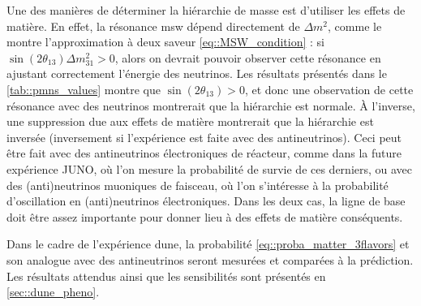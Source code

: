             Une des manières de déterminer la hiérarchie de masse est d'utiliser les effets de matière. En effet, la résonance \gls{msw} dépend directement de $\Delta m^2$, comme le montre l'approximation à deux saveur \eqref{eq::MSW_condition} : si $\sin(2\theta_{13})\Delta m^2_{31} > 0$, alors on devrait pouvoir observer cette résonance en ajustant correctement l'énergie des neutrinos. Les résultats présentés dans le \autoref{tab::pmns_values} montre que $\sin(2\theta_{13}) > 0$, et donc une observation de cette résonance avec des neutrinos montrerait que la hiérarchie est normale. À l'inverse, une suppression due aux effets de matière montrerait que la hiérarchie est inversée (inversement si l'expérience est faite avec des antineutrinos). Ceci peut être fait avec des antineutrinos électroniques de réacteur, comme dans la future expérience JUNO\cite{Yang2015}, où l'on mesure la probabilité de survie de ces derniers, ou avec des (anti)neutrinos muoniques de faisceau, où l'on s'intéresse à la probabilité d'oscillation en (anti)neutrinos électroniques. Dans les deux cas, la ligne de base doit être assez importante pour donner lieu à des effets de matière conséquents.
            
            Dans le cadre de l'expérience \gls{dune}, la probabilité \eqref{eq::proba_matter_3flavors} et son analogue avec des antineutrinos seront mesurées et comparées à la prédiction. Les résultats attendus ainsi que les sensibilités sont présentés en \autoref{sec::dune_pheno}. 
            

